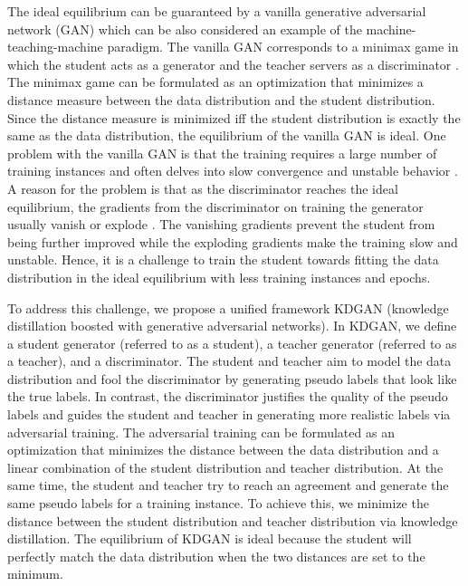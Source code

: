 \documentclass{article}
\begin{document}
The ideal equilibrium can be guaranteed by a vanilla generative adversarial network (GAN) which can be also considered an example of the machine-teaching-machine paradigm.
The vanilla GAN corresponds to a minimax game in which the student acts as a generator and the teacher servers as a discriminator \cite{wang2017irgan}.
The minimax game can be formulated as an optimization that minimizes a distance measure between the data distribution and the student distribution.
Since the distance measure is minimized iff the student distribution is exactly the same as the data distribution, the equilibrium of the vanilla GAN is ideal.
One problem with the vanilla GAN is that the training requires a large number of training instances and often delves into slow convergence and unstable behavior \cite{feizi2017understanding}.
A reason for the problem is that as the discriminator reaches the ideal equilibrium, the gradients from the discriminator on training the generator usually vanish or explode \cite{arjovsky2017towards}.
The vanishing gradients prevent the student from being further improved while the exploding gradients make the training slow and unstable.
Hence, it is a challenge to train the student towards fitting the data distribution in the ideal equilibrium with less training instances and epochs.

To address this challenge, we propose a unified framework KDGAN (knowledge distillation boosted with generative adversarial networks).
In KDGAN, we define a student generator (referred to as a student), a teacher generator (referred to as a teacher), and a discriminator.
The student and teacher aim to model the data distribution and fool the discriminator by generating pseudo labels that look like the true labels.
In contrast, the discriminator justifies the quality of the pseudo labels and guides the student and teacher in generating more realistic labels via adversarial training.
The adversarial training can be formulated as an optimization that minimizes the distance between the data distribution and a linear combination of the student distribution and teacher distribution.
At the same time, the student and teacher try to reach an agreement and generate the same pseudo labels for a training instance.
To achieve this, we minimize the distance between the student distribution and teacher distribution via knowledge distillation.
The equilibrium of KDGAN is ideal because the student will perfectly match the data distribution when the two distances are set to the minimum.
\end{document}
